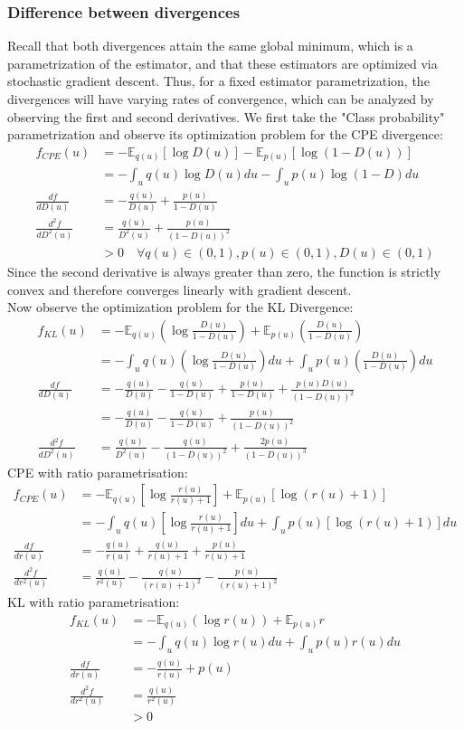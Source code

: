\documentclass[a4paper,12pt]{article}
\newcommand{\E}{\mathbb{E}}
\numberwithin{equation}{section}
\begin{document}
\subsubsection{Difference between divergences}
Recall that both divergences attain the same global minimum, which is a parametrization of the estimator, and that these estimators are optimized via stochastic gradient descent. Thus, for a fixed estimator parametrization, the divergences will have varying rates of convergence, which can be analyzed by observing the first and second derivatives. We first take the "Class probability" parametrization and observe its optimization problem for the CPE divergence:
\begin{align*}
f_{CPE}(u)&=-\E_{q(u)}[\log D(u)]-\E_{p(u)}[\log (1-D(u))]\\
&=-\int_u q(u)\log D(u) du -\int_u p(u)\log(1-D)du\\
\frac{df}{dD(u)}&=-\frac{q(u)}{D(u)}+\frac{p(u)}{1-D(u)}\\
\frac{d^2f}{dD^2(u)}&=\frac{q(u)}{D^2(u)}+\frac{p(u)}{(1-D(u))^2}\\
&>0 \quad \forall q(u)\in(0,1), p(u)\in (0,1), D(u)\in (0,1) 
\end{align*}
Since the second derivative is always greater than zero, the function is strictly convex and therefore converges linearly with gradient descent.\\
Now observe the optimization problem for the KL Divergence:
\begin{align*}
f_{KL}(u)&=-\E_{q(u)}\left(\log \frac{D(u)}{1-D(u)}\right)+\E_{p(u)}\left(\frac{D(u)}{1-D(u)}\right)\\
&=-\int_u q(u)\left(\log \frac{D(u)}{1-D(u)}\right)du+\int_u p(u)\left(\frac{D(u)}{1-D(u)}\right)du\\
\frac{df}{dD(u)}&=-\frac{q(u)}{D(u)}-\frac{q(u)}{1-D(u)}+\frac{p(u)}{1-D(u)}+\frac{p(u)D(u)}{(1-D(u))^2}\\
&=-\frac{q(u)}{D(u)}-\frac{q(u)}{1-D(u)}+\frac{p(u)}{(1-D(u))^2}\\
\frac{d^2f}{dD^2(u)}&=\frac{q(u)}{D^2(u)}-\frac{q(u)}{(1-D(u))^2}+\frac{2p(u)}{(1-D(u))^3}
\end{align*}
CPE with ratio parametrisation:
\begin{align*}
f_{CPE}(u)&=-\E_{q(u)}\left[\log \frac{r(u)}{r(u)+1}\right]+\E_{p(u)}\left[\log(r(u)+1)\right]\\
&=-\int_u q(u)\left[\log \frac{r(u)}{r(u)+1}\right]du+\int_u p(u)\left[\log(r(u)+1)\right]du\\
\frac{df}{dr(u)}&=-\frac{q(u)}{r(u)}+\frac{q(u)}{r(u)+1}+\frac{p(u)}{r(u)+1}\\
\frac{d^2f}{dr^2(u)}&=\frac{q(u)}{r^2(u)}-\frac{q(u)}{(r(u)+1)^2}-\frac{p(u)}{(r(u)+1)^2}
\end{align*}
KL with ratio parametrisation:
\begin{align*}
f_{KL}(u)&=-\E_{q(u)}(\log r(u))+\E_{p(u)}r\\
&=-\int_u q(u)\log r(u) du+\int_u p(u)r(u)du\\
\frac{df}{dr(u)}&=-\frac{q(u)}{r(u)}+p(u)\\
\frac{d^2f}{dr^2(u)}&=\frac{q(u)}{r^2(u)}\\
&>0
\end{align*}
\end{document}
